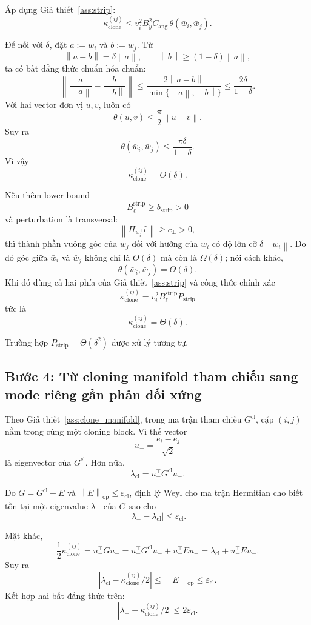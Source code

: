 \documentclass[11pt,a4paper]{article}
\newcommand{\norm}[1]{\left\lVert #1 \right\rVert}
\newcommand{\abs}[1]{\left\lvert #1 \right\rvert}
\DeclareMathOperator{\op}{op}
\begin{document}
Áp dụng Giả thiết~\ref{ass:strip}:
\[
\kappa_{\mathrm{clone}}^{(ij)}
\le
v_i^2 B_y^2 C_{\mathrm{ang}}\, \theta(\bar w_i,\bar w_j).
\]
\medskip

Để nối với $\delta$, đặt $a:=w_i$ và $b:=w_j$. Từ
\[
\norm{a-b} = \delta \norm{a},
\qquad
\norm{b} \ge (1-\delta)\norm{a},
\]
ta có bất đẳng thức chuẩn hóa chuẩn:
\[
\left\|
\frac{a}{\norm{a}} - \frac{b}{\norm{b}}
\right\|
\le
\frac{2\norm{a-b}}{\min\{\norm{a},\norm{b}\}}
\le
\frac{2\delta}{1-\delta}.
\]
Với hai vector đơn vị $u,v$, luôn có
\[
\theta(u,v) \le \frac{\pi}{2}\norm{u-v}.
\]
Suy ra
\[
\theta(\bar w_i,\bar w_j) \le \frac{\pi\delta}{1-\delta}.
\]
Vì vậy
\[
\kappa_{\mathrm{clone}}^{(ij)} = O(\delta).
\]

Nếu thêm lower bound
\[
B_\ell^{\mathrm{strip}} \ge b_{\mathrm{strip}} > 0
\]
và perturbation là transversal:
\[
\norm{\Pi_{w_i^\perp}\hat e} \ge c_\perp > 0,
\]
thì thành phần vuông góc của $w_j$ đối với hướng của $w_i$ có độ lớn cỡ
$\delta \norm{w_i}$. Do đó góc giữa $\bar w_i$ và $\bar w_j$ không chỉ là
$O(\delta)$ mà còn là $\Omega(\delta)$; nói cách khác,
\[
\theta(\bar w_i,\bar w_j)=\Theta(\delta).
\]
Khi đó dùng cả hai phía của Giả thiết~\ref{ass:strip} và công thức chính xác
\[
\kappa_{\mathrm{clone}}^{(ij)}
=
v_i^2 B_\ell^{\mathrm{strip}} P_{\mathrm{strip}}
\]
tức là
\[
\kappa_{\mathrm{clone}}^{(ij)} = \Theta(\delta).
\]

Trường hợp $P_{\mathrm{strip}} = \Theta(\delta^2)$ được xử lý tương tự.

\subsection*{Bước 4: Từ cloning manifold tham chiếu sang mode riêng gần phản đối xứng}

Theo Giả thiết~\ref{ass:clone_manifold}, trong ma trận tham chiếu
$G^{\mathrm{cl}}$, cặp $(i,j)$ nằm trong cùng một cloning block. Vì thế vector
\[
u_- = \frac{e_i-e_j}{\sqrt 2}
\]
là eigenvector của $G^{\mathrm{cl}}$. Hơn nữa,
\[
\lambda_{\mathrm{cl}} = u_-^\top G^{\mathrm{cl}} u_-.
\]

Do $G = G^{\mathrm{cl}} + E$ và $\norm{E}_{\op} \le \varepsilon_{\mathrm{cl}}$,
định lý Weyl cho ma trận Hermitian cho biết tồn tại một eigenvalue $\lambda_-$ của
$G$ sao cho
\[
\abs{\lambda_- - \lambda_{\mathrm{cl}}} \le \varepsilon_{\mathrm{cl}}.
\]

\medskip

Mặt khác,
\[
\frac{1}{2}\kappa_{\mathrm{clone}}^{(ij)}
=
u_-^\top G u_-
=
u_-^\top G^{\mathrm{cl}} u_- + u_-^\top E u_-
=
\lambda_{\mathrm{cl}} + u_-^\top E u_-.
\]
Suy ra
\[
\abs{\lambda_{\mathrm{cl}} - \kappa_{\mathrm{clone}}^{(ij)}/2}
\le
\norm{E}_{\op}
\le
\varepsilon_{\mathrm{cl}}.
\]
Kết hợp hai bất đẳng thức trên:
\[
\abs{\lambda_- - \kappa_{\mathrm{clone}}^{(ij)}/2}
\le
2\varepsilon_{\mathrm{cl}}.
\]
\end{document}
